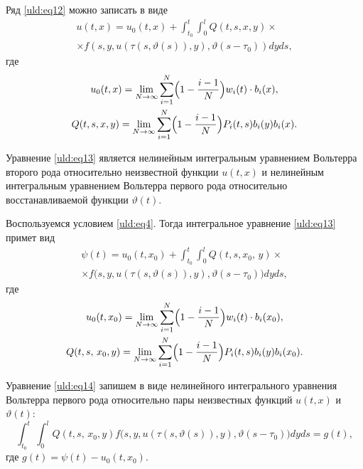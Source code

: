 Ряд \eqref{uld:eq12} можно записать в виде
\begin{multline}
\label{uld:eq13}
u (t, x)=u_0 (t,  x) +\int_{t_0}
^t \int_0^l Q (t, s , x , y) \times \\ \times f \left(s, y, u (\tau (s, \vartheta (s)) , y),  \vartheta  (s-\tau_0) \right) dy ds,
\end{multline}
где
\begin{gather*}
u_0 (t , x)= \lim \limits_{N\to \infty }
\sum\limits_{i =1}^N \Bigl( 1-\frac{i-1}{N}\Bigr)  w_i (t) \cdot b_i  (x),
\\
Q (t, s, x, y)=\lim \limits_{N\to \infty }
\sum\limits_{i =1}^N \Bigl( 1-\frac{i-1}{N}\Bigr) P_i (t , s) b_i (y)  b_i( x ).
\end{gather*}

Уравнение \eqref{uld:eq13} является нелинейным интегральным уравнением
Вольтерра второго рода относительно неизвестной функции $u (t, x)$ и нелинейным интегральным уравнением Вольтерра первого рода
относительно восстанавливаемой функции $\vartheta(t)$.

\smallskip

 Воспользуемся условием \eqref{uld:eq4}. Тогда интегральное уравнение
\eqref{uld:eq13} примет вид
\begin{multline}
\label{uld:eq14}
\psi(t)=u_0 (t,  x_0)+\int_{t_0}^t \int_0^l Q(t, s , x_0,\,y) \times \\ \times f \bigl(s, y, u (\tau (s , \vartheta
 (s)),y) , \vartheta  (s-\tau_0) \bigr)dy ds,
 \end{multline}
где
\begin{gather*}
u_0 (t, x_0)=\lim \limits_{N \to \infty} \sum \limits_{i =1}^N \Bigl( 1-\frac{i-1}{N}\Bigr)  w_i
(t) \cdot b_i ( x_0), 
\\
Q (t, s,\,x_0 , y)=\lim \limits_{N\to \infty }
\sum \limits_{i =1}^N \Bigl( 1-\frac{i-1}{N}\Bigr) P_i (t, s) b_i  (y)  b_i  ( x_0).
\end{gather*}

Уравнение \eqref{uld:eq14} запишем в виде нелинейного интегрального уравнения Вольтерра первого рода относительно пары неизвестных функций $u (t , x)$ и $\vartheta  (t)$:
\begin{equation}
\label{uld:eq15}
\int_{t_0}^t \int_0^l Q(t, s,\,x_0 , y) f \bigl(s, y, u (\tau  (s, \vartheta
(s)), y) , \vartheta  (s-\tau_0)\bigr)dy ds=g (t),
\end{equation}
где $g (t)=\psi(t )-u_0 (t,  x_0)$.

